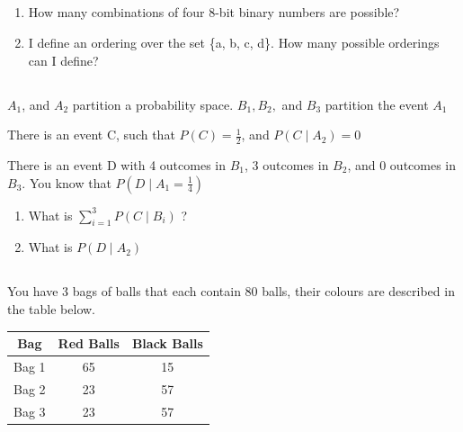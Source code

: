 \documentclass[twocolumn]{article}
\begin{document}
\subsection{}

    \begin{enumerate}
        \item How many combinations of four 8-bit binary numbers are possible?
        \item I define an ordering over the set \{a, b, c, d\}. How many possible orderings can I define?
    \end{enumerate}

\subsection{}

    $A_1$, and $A_2$ partition a probability space. $B_1, B_2,$ and $B_3$ partition the event $A_1$

    There is an event C, such that $P(C) = \frac{1}{2}$, and $P(C \mid A_2) = 0$
    
    There is an event D with 4 outcomes in $B_1$, 3 outcomes in $B_2$, and 0 outcomes in $B_3$. You know that $P (D \mid A_1 = \frac{1}{4})$

    \begin{enumerate}
        \item What is $\sum_{i=1}^3 P(C \mid B_i) $ ?
        \item What is $P(D \mid A_2)$
    \end{enumerate}
    
\subsection{}

    You have 3 bags of balls that each contain 80 balls, their colours are described in the table below.

    \begin{table}[h!]
        \centering
        \begin{tabular}{c | c | c }
            \toprule
            Bag & Red Balls & Black Balls \\
            \midrule
            Bag 1 & 65 & 15  \\
            Bag 2 & 23 & 57  \\
            Bag 3 & 23 & 57 \\
            \bottomrule
        \end{tabular}
    \end{table}
\end{document}
